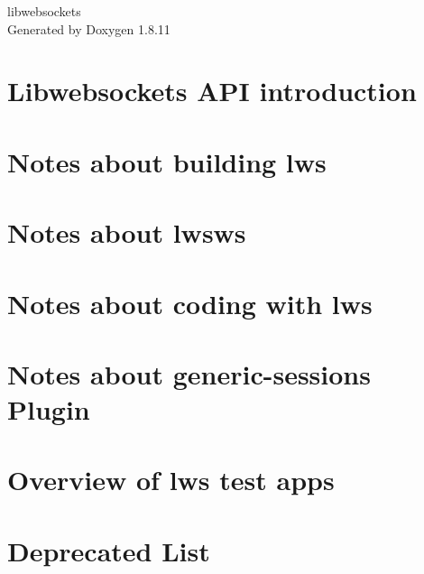 \documentclass[twoside]{book}
\newcommand{\+}{\discretionary{\mbox{\scriptsize$\hookleftarrow$}}{}{}}
\newcommand{\clearemptydoublepage}{%
  \newpage{\pagestyle{empty}\cleardoublepage}%
}
\begin{document}
\hypersetup{pageanchor=false,
             bookmarksnumbered=true,
             pdfencoding=unicode
            }
\begin{titlepage}
\vspace*{7cm}
\begin{center}%
{\Large libwebsockets }\\
\vspace*{1cm}
{\large Generated by Doxygen 1.8.11}\\
\end{center}
\end{titlepage}
\clearemptydoublepage
\tableofcontents
\clearemptydoublepage
{}
\hypersetup{pageanchor=true}

\chapter{Libwebsockets A\+PI introduction}
\label{index}\hypertarget{index}{}
\chapter{Notes about building lws}
\label{md_README.build}
\hypertarget{md_README.build}{}

\chapter{Notes about lwsws}
\label{md_README.lwsws}
\hypertarget{md_README.lwsws}{}

\chapter{Notes about coding with lws}
\label{md_README.coding}
\hypertarget{md_README.coding}{}

\chapter{Notes about generic-\/sessions Plugin}
\label{md_README.generic-sessions}
\hypertarget{md_README.generic-sessions}{}

\chapter{Overview of lws test apps}
\label{md_README.test-apps}
\hypertarget{md_README.test-apps}{}

\chapter{Deprecated List}
\label{deprecated}
\hypertarget{deprecated}{}

\end{document}
